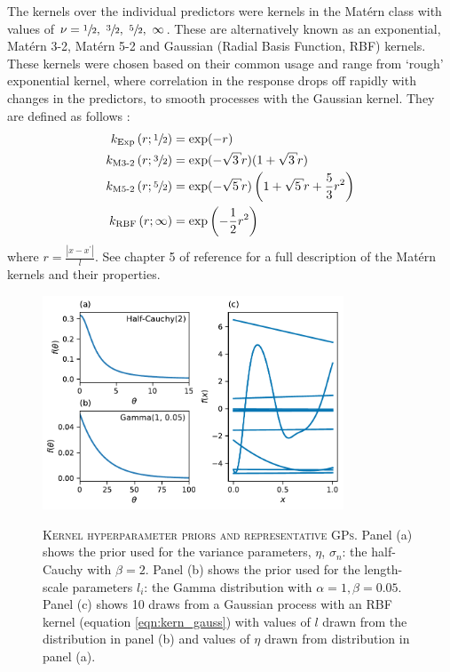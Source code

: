 The kernels over the individual predictors were kernels in the Mat\'{e}rn class with values of $\nu=\sfrac{1}{2},\ \sfrac{3}{2},\ \sfrac{5}{2},\ \infty$. These are alternatively known as an exponential, Mat\'{e}rn 3-2, Mat\'{e}rn 5-2 and  Gaussian (Radial Basis Function, RBF) kernels.  These kernels were chosen based on their common usage \cite{shahriariTakingHumanOut2016} and  range from `rough' exponential kernel, where correlation in the response drops off rapidly with changes in the predictors, to smooth processes with the Gaussian kernel. They are defined as follows \cite{rasmussenGaussianProcessesMachine2006}: 
\begin{align}
k_{\text{Exp}}\left(r; \sfrac{1}{2}\right) &=\exp (-r) \label{eqn:kern_exp}\\
k_{\text{M3-2}}\left(r; \sfrac{3}{2}\right) &= \exp (-\sqrt{3} r)(1+\sqrt{3} r) \label{eqn:kern_m32} \\
k_{\text{M5-2}}\left(r; \sfrac{5}{2}\right) &= \exp (-\sqrt{5} r)\left(1+\sqrt{5} r+\frac{5}{3} r^{2}\right) \label{eqn:kern_m52}\\
k_{\text{RBF}}\left(r; \infty\right) &= \exp \left(-\frac{1}{2} r^{2}\right) \label{eqn:kern_gauss}
\end{align}
where $r = \frac{|x-x^{\prime}|}{l}$. See chapter 5 of  reference \cite{rasmussenGaussianProcessesMachine2006} for a full description of the Mat\'{e}rn kernels and their properties.  

\begin{figure}
    \centering
    \caption[Kernel hyperparameter priors and representative GPs]{\textsc{Kernel hyperparameter priors and representative GPs}. Panel (a) shows the prior used for the variance parameters, $\eta$, $\sigma_n$: the half-Cauchy with $\beta=2$. Panel (b) shows the prior used for the length-scale parameters $l_{i}$: the Gamma distribution with $\alpha=1, \beta=0.05$.  Panel (c) shows 10 draws from a Gaussian process with an RBF kernel (equation \ref{eqn:kern_gauss}) with values of $l$ drawn from the distribution in panel (b) and values of $\eta$ drawn from distribution in panel (a).}
    \includegraphics[width=0.8\textwidth]{chapters/msm_optimization/figures/prior_functions.pdf}
    \label{fig:priors}
\end{figure}

